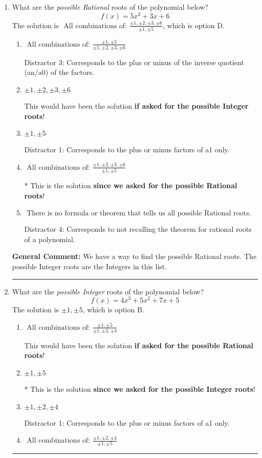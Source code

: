 \documentclass{extbook}[14pt]
\newcommand{\litem}[1]{\item #1

\rule{\textwidth}{0.4pt}}
\begin{document}
\begin{enumerate}\litem{
What are the \textit{possible Rational} roots of the polynomial below?
\[ f(x) = 5x^{2} +3 x + 6 \]The solution is \( \text{ All combinations of: }\frac{\pm 1,\pm 2,\pm 3,\pm 6}{\pm 1,\pm 5} \), which is option D.\begin{enumerate}[label=\Alph*.]
\item \( \text{ All combinations of: }\frac{\pm 1,\pm 5}{\pm 1,\pm 2,\pm 3,\pm 6} \)

 Distractor 3: Corresponds to the plus or minus of the inverse quotient (an/a0) of the factors. 
\item \( \pm 1,\pm 2,\pm 3,\pm 6 \)

This would have been the solution \textbf{if asked for the possible Integer roots}!
\item \( \pm 1,\pm 5 \)

 Distractor 1: Corresponds to the plus or minus factors of a1 only.
\item \( \text{ All combinations of: }\frac{\pm 1,\pm 2,\pm 3,\pm 6}{\pm 1,\pm 5} \)

* This is the solution \textbf{since we asked for the possible Rational roots}!
\item \( \text{ There is no formula or theorem that tells us all possible Rational roots.} \)

 Distractor 4: Corresponds to not recalling the theorem for rational roots of a polynomial.
\end{enumerate}

\textbf{General Comment:} We have a way to find the possible Rational roots. The possible Integer roots are the Integers in this list.
}
\litem{
What are the \textit{possible Integer} roots of the polynomial below?
\[ f(x) = 4x^{3} +5 x^{2} +7 x + 5 \]The solution is \( \pm 1,\pm 5 \), which is option B.\begin{enumerate}[label=\Alph*.]
\item \( \text{ All combinations of: }\frac{\pm 1,\pm 5}{\pm 1,\pm 2,\pm 4} \)

This would have been the solution \textbf{if asked for the possible Rational roots}!
\item \( \pm 1,\pm 5 \)

* This is the solution \textbf{since we asked for the possible Integer roots}!
\item \( \pm 1,\pm 2,\pm 4 \)

 Distractor 1: Corresponds to the plus or minus factors of a1 only.
\item \( \text{ All combinations of: }\frac{\pm 1,\pm 2,\pm 4}{\pm 1,\pm 5} \)


\end{enumerate}}
\end{enumerate}
\end{document}
